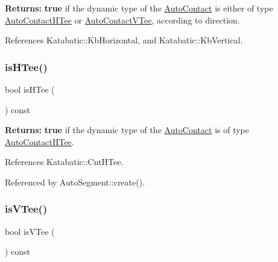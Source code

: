 {\bfseries Returns\+:} {\bfseries true} if the dynamic type of the \hyperlink{classKatabatic_1_1AutoContact}{Auto\+Contact} is either of type \hyperlink{classKatabatic_1_1AutoContactHTee}{Auto\+Contact\+H\+Tee} or \hyperlink{classKatabatic_1_1AutoContactVTee}{Auto\+Contact\+V\+Tee}, according to {\ttfamily direction}. 

References Katabatic\+::\+Kb\+Horizontal, and Katabatic\+::\+Kb\+Vertical.

\mbox{\label{classKatabatic_1_1AutoContact_aeb66931d535cbd3d0f9bc525968e15f5}} 
\subsubsection{\texorpdfstring{is\+H\+Tee()}{isHTee()}}
{\footnotesize\ttfamily bool is\+H\+Tee (\begin{DoxyParamCaption}{ }\end{DoxyParamCaption}) const\hspace{0.3cm}{\ttfamily [inline]}}

{\bfseries Returns\+:} {\bfseries true} if the dynamic type of the \hyperlink{classKatabatic_1_1AutoContact}{Auto\+Contact} is of type \hyperlink{classKatabatic_1_1AutoContactHTee}{Auto\+Contact\+H\+Tee}. 

References Katabatic\+::\+Cnt\+H\+Tee.



Referenced by Auto\+Segment\+::create().

\mbox{\label{classKatabatic_1_1AutoContact_ae38846b6213cccbc6f008b175b4604b0}} 
\subsubsection{\texorpdfstring{is\+V\+Tee()}{isVTee()}}
{\footnotesize\ttfamily bool is\+V\+Tee (\begin{DoxyParamCaption}{ }\end{DoxyParamCaption}) const\hspace{0.3cm}{\ttfamily [inline]}}

